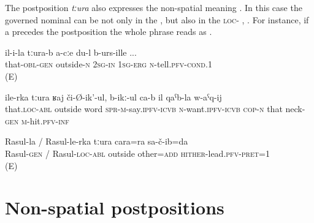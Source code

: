 The postposition \textit{tːura} also expresses the non-spatial meaning . In this case the governed nominal can be not only in the  , but also in the \textsc{loc}- , . For instance, if a  precedes the postposition the whole phrase reads as .
%
\begin{exe}
	\ex
	\begin{xlist}
		\ex	\label{If I can tell you now (something else) apart from this}
		\gll	il-i-la	tːura-b	a-cːe	du-l	b-urs-ille  ...\\
			that-\textsc{obl}-\textsc{gen}	outside-\textsc{n}	2\textsc{sg}-\textsc{in}	1\textsc{sg}-\textsc{erg}	\textsc{n}-tell.\textsc{pfv}-\textsc{cond}.1\\
		\glt	{} (E)

		\ex	\label{Moreover, he defamed (him) and wanted (him) to be beheaded}
		\gll	ile-rka tːura		ʁaj	či-Ø-ik'-ul,	b-ikː-ul ca-b	il	qaˁb-la	w-aˁq-ij\\
			that.\textsc{loc}-\textsc{abl}	outside	word	\textsc{spr}-\textsc{m}-say.\textsc{ipfv}-\textsc{icvb}	\textsc{n}-want.\textsc{ipfv}-\textsc{icvb} \textsc{cop-n}	that	neck-\textsc{gen}	\textsc{m}-hit.\textsc{pfv}-\textsc{inf}\\
		\glt	{}

		\ex	\label{Apart from Rasul I also brought another one}
		\gll	Rasul-la	/	Rasul-le-rka	tːura	cara=ra	sa-č-ib=da  \\
			Rasul-\textsc{gen}	/ Rasul-\textsc{loc}-\textsc{abl}	outside	other=\textsc{add}	\textsc{hither}-lead.\textsc{pfv}-\textsc{pret}=1\\
		\glt	{} (E)
	\end{xlist}
\end{exe}



\section{Non-spatial postpositions}
\label{sec:Non-spatial postpositions}


